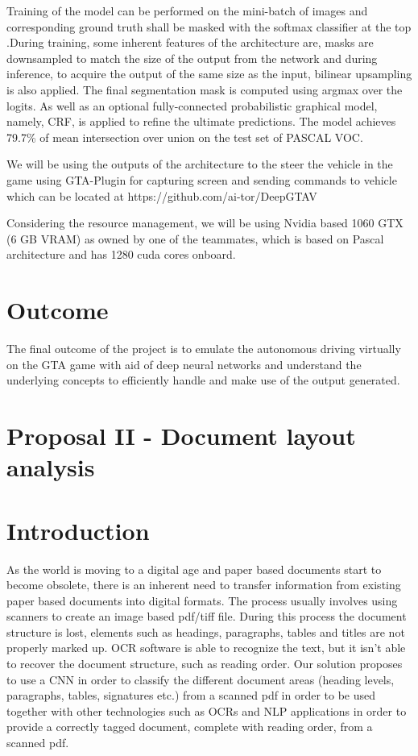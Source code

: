 \documentclass[10pt,twocolumn,letterpaper]{article}
\begin{document}
	Training of the model can be performed on the mini-batch of images and corresponding ground truth shall be masked with the softmax classifier at the top .During training, some inherent features of the architecture are, masks are downsampled to match the size of the output from the network and during inference, to acquire the output of the same size as the input, bilinear upsampling is also applied. The final segmentation mask is computed using argmax over the logits. As well as an optional fully-connected probabilistic graphical model, namely, CRF, is applied to refine the ultimate predictions. The model achieves 79.7\% of mean intersection over union on the test set of PASCAL VOC. 
	
	We will be using the outputs of the architecture to the steer the vehicle in the game using GTA-Plugin for capturing screen and sending commands to vehicle which can be located at https://github.com/ai-tor/DeepGTAV
	
	Considering the resource management, we will be using Nvidia based 1060 GTX (6 GB VRAM) as owned by one of the teammates, which is based on Pascal architecture and has 1280 cuda cores onboard.
	
	\section{Outcome}
	The final outcome of the project is to emulate the autonomous driving virtually on the GTA game with aid of deep neural networks and understand the underlying concepts to efficiently handle and make use of the output generated.  
	
	
	\section*{Proposal II - Document layout analysis}
	\setcounter{section}{0}
	
	\section{Introduction}
	As the world is moving to a digital age and paper based documents start to become obsolete, there is an inherent need to transfer information from existing paper based documents into digital formats. The process usually involves using scanners to create an image based pdf/tiff file. During this process the document structure is lost, elements such as headings, paragraphs, tables and titles are not properly marked up. OCR software is able to recognize the text, but it isn't able to recover the document structure, such as reading order. Our solution proposes to use a CNN in order to classify the different document areas (heading levels, paragraphs, tables, signatures etc.) from a scanned pdf in order to be used together with other technologies such as OCRs and NLP applications in order to provide a correctly tagged document, complete with reading order, from a scanned pdf.
	
\end{document}
